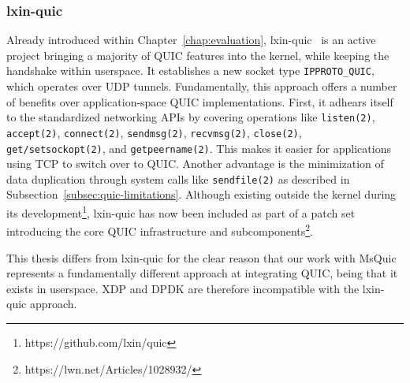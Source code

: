 \subsubsection{lxin-quic}
Already introduced within Chapter~\ref{chap:evaluation}, lxin-quic~\cite{quic_lxin} is an active project bringing a majority of QUIC features into the kernel, while keeping the handshake within userspace. It establishes a new socket type \texttt{IPPROTO\_QUIC}, which operates over \ac{UDP} tunnels. Fundamentally, this approach offers a number of benefits over application-space QUIC implementations. First, it adhears itself to the standardized networking APIs by covering operations like \texttt{listen(2)}, \texttt{accept(2)}, \texttt{connect(2)}, \texttt{sendmsg(2)}, \texttt{recvmsg(2)}, \texttt{close(2)}, \texttt{get/setsockopt(2)}, and \texttt{getpeername(2)}. This makes it easier for applications using \ac{TCP} to switch over to QUIC. Another advantage is the minimization of data duplication through system calls like \texttt{sendfile(2)} as described in Subsection~\ref{subsec:quic-limitations}. Although existing outside the kernel during its development\footnote{https://github.com/lxin/quic}, lxin-quic has now been included as part of a patch set introducing the core QUIC infrastructure and subcomponents\footnote{https://lwn.net/Articles/1028932/}.

This thesis differs from lxin-quic for the clear reason that our work with MsQuic represents a fundamentally different approach at integrating QUIC, being that it exists in userspace. \ac{XDP} and \ac{DPDK} are therefore incompatible with the lxin-quic approach.


